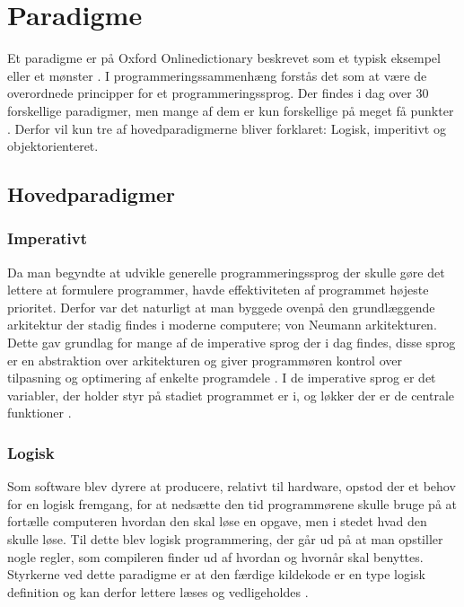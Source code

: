 \section{Paradigme}\label{sec:paradigmer}

Et paradigme er på Oxford Onlinedictionary beskrevet som et typisk eksempel eller et mønster \cite{Oxford_????}. I programmeringssammenhæng forstås det som at være de overordnede principper for et programmeringssprog. Der findes i dag over 30 forskellige paradigmer, men mange af dem er kun forskellige på meget få punkter \cite{Roy_2009}. Derfor vil kun tre af hovedparadigmerne bliver forklaret: Logisk, imperitivt og objektorienteret.

\subsection{Hovedparadigmer}\label{ssec:hovedparadigmer}
\subsubsection*{Imperativt}
Da man begyndte at udvikle generelle programmeringssprog der skulle gøre det lettere at formulere programmer, havde effektiviteten af programmet højeste prioritet. Derfor var det naturligt at man byggede ovenpå den grundlæggende arkitektur der stadig findes i moderne computere; von Neumann arkitekturen. Dette gav grundlag for mange af de imperative sprog der i dag findes, disse sprog er en abstraktion over arkitekturen og giver programmøren kontrol over tilpasning og optimering af enkelte programdele \cite[38-39]{Sebesta_2013}. I de imperative sprog er det variabler, der holder styr på stadiet programmet er i, og løkker der er de centrale funktioner \cite{Sebesta_2013}.

\subsubsection*{Logisk}
Som software blev dyrere at producere, relativt til hardware, opstod der et behov for en logisk fremgang, for at nedsætte den tid programmørene skulle bruge på at fortælle computeren hvordan den skal løse en opgave, men i stedet hvad den skulle løse. Til dette blev logisk programmering, der går ud på at man opstiller nogle regler, som compileren finder ud af hvordan og hvornår skal benyttes. Styrkerne ved dette paradigme er at den færdige kildekode er en type logisk definition og kan derfor lettere læses og vedligeholdes \cite[kapitel 16]{Sebesta_2013}.

